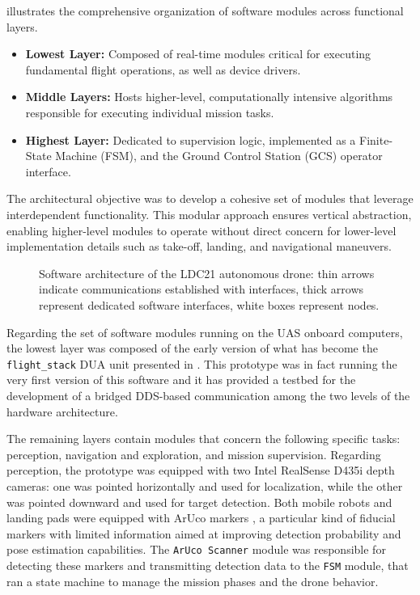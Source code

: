  illustrates the comprehensive organization of software modules across functional layers.
\begin{itemize}
  \item \textbf{Lowest Layer:} Composed of real-time modules critical for executing fundamental flight operations, as well as device drivers.
  \item \textbf{Middle Layers:} Hosts higher-level, computationally intensive algorithms responsible for executing individual mission tasks.
  \item \textbf{Highest Layer:} Dedicated to supervision logic, implemented as a Finite-State Machine (FSM), and the Ground Control Station (GCS) operator interface.
\end{itemize}
The architectural objective was to develop a cohesive set of \ROS modules that leverage interdependent functionality. This modular approach ensures vertical abstraction, enabling higher-level modules to operate without direct concern for lower-level implementation details such as take-off, landing, and navigational maneuvers.
\begin{figure}[!t]
  \centering
  
  \caption{Software architecture of the LDC21 autonomous drone: thin arrows indicate communications established with \ROS interfaces, thick arrows represent dedicated software interfaces, white boxes represent \ROS nodes.}
  \label{fig:ldc21swarch}
\end{figure}

Regarding the set of software modules running on the UAS onboard computers, the lowest layer was composed of the early version of what has become the \texttt{flight\_stack} DUA unit presented in . This prototype was in fact running the very first version of this software and it has provided a testbed for the development of a bridged DDS-based communication among the two levels of the hardware architecture.

The remaining layers contain modules that concern the following specific tasks: perception, navigation and exploration, and mission supervision. Regarding perception, the prototype was equipped with two Intel RealSense D435i depth cameras: one was pointed horizontally and used for localization, while the other was pointed downward and used for target detection. Both mobile robots and landing pads were equipped with ArUco markers \cite{romero-ramirez_speeded_2018,garrido-jurado_generation_2016}, a particular kind of fiducial markers with limited information aimed at improving detection probability and pose estimation capabilities. The \texttt{ArUco Scanner} module was responsible for detecting these markers and transmitting detection data to the \texttt{FSM} module, that ran a state machine to manage the mission phases and the drone behavior.

